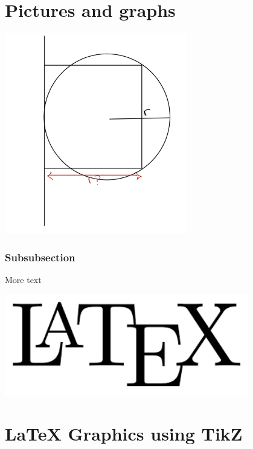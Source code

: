 \documentclass[12pt,a4paper]{article}
\theoremstyle{definition}
\theoremstyle{remark}
\begin{document}
\section{Pictures and graphs}\label{sec:pictures_graphs}

\includegraphics[width=0.6\textwidth]{./figs/radius_scure.jpg}

\subsubsection{Subsubsection}\label{sec:nothing2}

More text \cite{Someone2000}

\includegraphics[width=0.8\textwidth]{./figs/latex_logo.png}


\section{LaTeX Graphics using TikZ}

\bigskip 
\begin{center}
\end{center}
\end{document}
